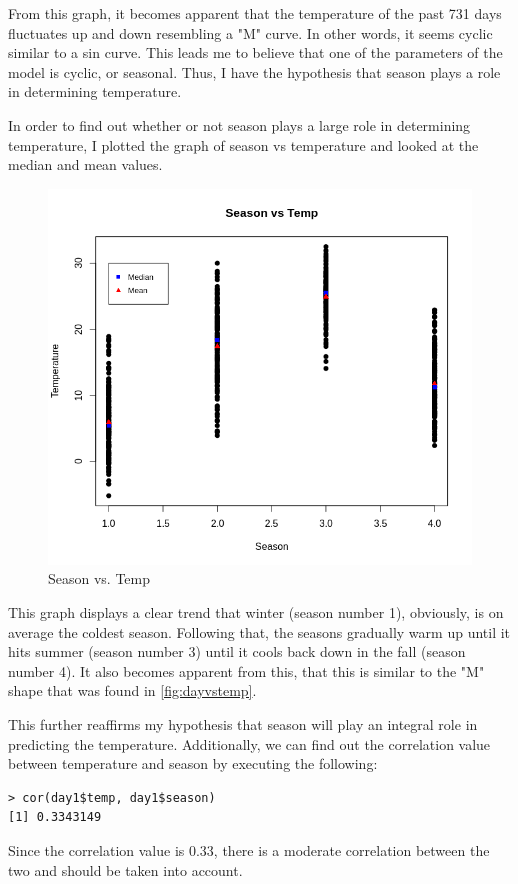 \documentclass[12pt]{article}
\begin{document}
From this graph, it becomes apparent that the temperature of the past 731 days fluctuates up and down resembling a "M" curve. In other words, it seems cyclic similar to a sin curve. This leads me to believe that one of the parameters of the model is cyclic, or seasonal. Thus, I have the hypothesis that season plays a role in determining temperature.

In order to find out whether or not season plays a large role in determining temperature, I plotted the graph of season vs temperature and looked at the median and mean values.
\begin{figure}[H]
	\centering
  	\includegraphics[width=150mm]{seasonvstemp.png}
 	\caption{Season vs. Temp}
 	\label{fig:seasonvstemp}
\end{figure}
This graph displays a clear trend that winter (season number 1), obviously, is on average the coldest season. Following that, the seasons gradually warm up until it hits summer (season number 3) until it cools back down in the fall (season number 4). It also becomes apparent from this, that this is similar to the "M" shape that was found in \ref{fig:dayvstemp}.

This further reaffirms my hypothesis that season will play an integral role in predicting the temperature. Additionally, we can find out the correlation value between temperature and season by executing the following:
\begin{verbatim}
> cor(day1$temp, day1$season)
[1] 0.3343149
\end{verbatim}
Since the correlation value is 0.33, there is a moderate correlation between the two and should be taken into account.
\end{document}
